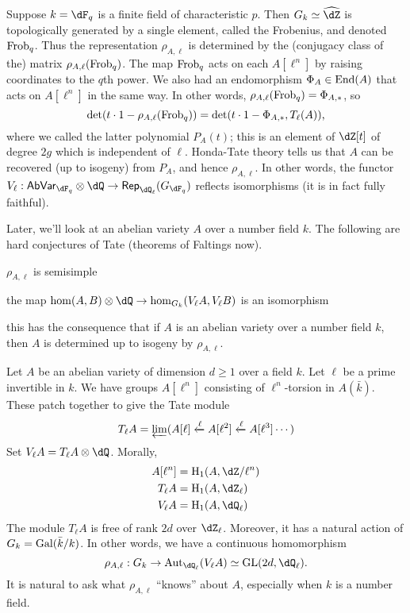\begin{example}
Suppose $k=\dF_q$ is a finite field of characteristic $p$. Then 
$G_k\simeq \widehat\dZ$ is topologically generated by a single element, called 
the Frobenius, and denoted $\mathrm{Frob}_q$. Thus the representation $\rho_{A,\ell}$ 
is determined by the (conjugacy class of the) matrix $\rho_{A,\ell}(\mathrm{Frob}_q)$. 
The map $\mathrm{Frob}_q$ acts on each $A[\ell^n]$ by raising coordinates to the 
$q$th power. We also had an endomorphism $\Phi_A\in \operatorname{End}(A)$ that acts on 
$A[\ell^n]$ in the same way. In other words, 
$\rho_{A,\ell}(\mathrm{Frob}_q) = \Phi_{A,\ast}$, so 
\[
  \det(t\cdot 1-\rho_{A,\ell}(\mathrm{Frob}_q)) = \det(t\cdot 1-\Phi_{A,\ast},T_\ell(A)) \text{,}
\]
where we called the latter polynomial $P_A(t)$; this is an element of 
$\dZ[t]$ of degree $2 g$ which is independent of $\ell$. Honda-Tate theory 
tells us that $A$ can be recovered (up to isogeny) from $P_A$, and hence 
$\rho_{A,\ell}$. In other words, the functor 
$V_\ell:\mathsf{AbVar}_{\dF_q}\otimes\dQ \to \mathsf{Rep}_{\dQ_\ell}(G_{\dF_q})$ 
reflects isomorphisms (it is in fact fully faithful). 
\end{example}

Later, we'll look at an abelian variety $A$ over a number field $k$. The following 
are hard conjectures of Tate (theorems of Faltings now). 

$\rho_{A,\ell}$ is semisimple 

the map $\hom(A,B)\otimes\dQ \to \hom_{G_k}(V_\ell A,V_\ell B)$ is an isomorphism 

this has the consequence that if $A$ is an abelian variety over a number field 
$k$, then $A$ is determined up to isogeny by $\rho_{A,\ell}$. 






Let $A$ be an abelian variety of dimension $d\geqslant 1$ over a field $k$. Let 
$\ell$ be a prime invertible in $k$. We have groups 
$A[\ell^n]$ consisting of $\ell^n$-torsion in $A(\bar k)$. These patch together 
to give the Tate module 
\[
  T_\ell A = \varprojlim (A[\ell] \xleftarrow\ell A[\ell^2] \xleftarrow\ell A[\ell^3]\cdots) 
\]
Set $V_\ell A = T_\ell A\otimes\dQ$. Morally, 
\begin{align*}
  A[\ell^n] &= \h_1(A,\dZ/\ell^n) \\
  T_\ell A  &= \h_1(A,\dZ_\ell) \\
  V_\ell A &= \h_1(A,\dQ_\ell)
\end{align*}
The module $T_\ell A$ is free of rank $2 d$ over $\dZ_\ell$. Moreover, it has a 
natural action of $G_k=\operatorname{Gal}(\bar k/k)$. In other words, we have a continuous 
homomorphism 
\[
  \rho_{A,\ell} : G_k \to \aut_{\dQ_\ell}(V_\ell A) \simeq \operatorname{GL}(2 d,\dQ_\ell) \text{.}
\]
It is natural to ask what $\rho_{A,\ell}$ ``knows'' about $A$, especially when 
$k$ is a number field. 


